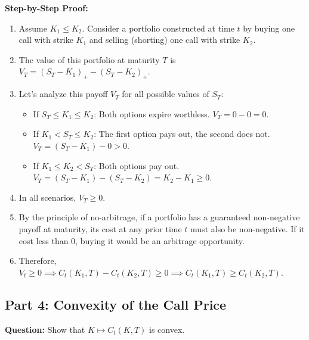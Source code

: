 \textbf{Step-by-Step Proof:}
\begin{enumerate}
    \item Assume $K_1 \le K_2$. Consider a portfolio constructed at time $t$ by buying one call with strike $K_1$ and selling (shorting) one call with strike $K_2$.
    \item The value of this portfolio at maturity $T$ is $V_T = (S_T - K_1)_+ - (S_T - K_2)_+$.
    \item Let's analyze this payoff $V_T$ for all possible values of $S_T$:
    \begin{itemize}
        \item If $S_T \le K_1 \le K_2$: Both options expire worthless. $V_T = 0 - 0 = 0$.
        \item If $K_1 < S_T \le K_2$: The first option pays out, the second does not. $V_T = (S_T - K_1) - 0 > 0$.
        \item If $K_1 \le K_2 < S_T$: Both options pay out. $V_T = (S_T - K_1) - (S_T - K_2) = K_2 - K_1 \ge 0$.
    \end{itemize}
    \item In all scenarios, $V_T \ge 0$.
    \item By the principle of no-arbitrage, if a portfolio has a guaranteed non-negative payoff at maturity, its cost at any prior time $t$ must also be non-negative. If it cost less than 0, buying it would be an arbitrage opportunity.
    \item Therefore, $V_t \ge 0 \implies C_t(K_1, T) - C_t(K_2, T) \ge 0 \implies C_t(K_1, T) \ge C_t(K_2, T)$.
\end{enumerate}

\subsection{Part 4: Convexity of the Call Price}

\textbf{Question:} Show that $K \mapsto C_t(K,T)$ is convex.

